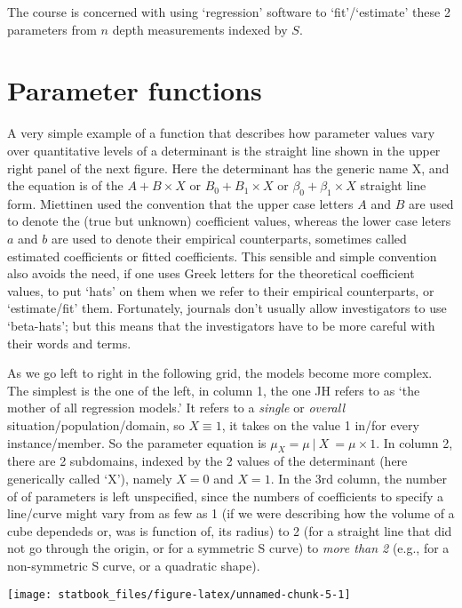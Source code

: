 \documentclass[]{book}
\begin{document}
The course is concerned with using `regression' software to `fit'/`estimate' these 2 parameters from \(n\) depth measurements indexed by \(S\).

\hypertarget{parameter-functions}{%
\section{Parameter functions}\label{parameter-functions}}

A very simple example of a function that describes how parameter values vary over quantitative levels of a determinant is the straight line shown in the upper right panel of the next figure. Here the determinant has the generic name X, and the equation is of the \(A + B \times X\) or \(B_0 + B_1 \times X\) or \(\beta_0 + \beta_1 \times X\) straight line form. Miettinen used the convention that the upper case letters \(A\) and \(B\) are used to denote the (true but unknown) coefficient values, whereas the lower case leters \(a\) and \(b\) are used to denote their empirical counterparts, sometimes called estimated coefficients or fitted coefficients. This sensible and simple convention also avoids the need, if one uses Greek letters for the theoretical coefficient values, to put `hats' on them when we refer to their empirical counterparts, or `estimate/fit' them. Fortunately, journals don't usually allow investigators to use `beta-hats'; but this means that the investigators have to be more careful with their words and terms.

As we go left to right in the following grid, the models become more complex. The simplest is the one of the left, in column 1, the one JH refers to as `the mother of all regression models.' It refers to a \emph{single} or \emph{overall} situation/population/domain, so \(X \equiv 1\), it takes on the value 1 in/for every instance/member. So the parameter equation is \(\mu_X = \mu \ | \ X \ = \mu \times 1.\) In column 2, there are 2 subdomains, indexed by the 2 values of the determinant (here generically called `X'), namely \(X = 0\) and \(X = 1\). In the 3rd column, the number of of parameters is left unspecified, since the numbers of coefficients to specify a line/curve might vary from as few as 1 (if we were describing how the volume of a cube dependeds or, was is function of, its radius) to 2 (for a straight line that did not go through the origin, or for a symmetric S curve) to \emph{more than 2} (e.g., for a non-symmetric S curve, or a quadratic shape).

\begin{center}\texttt{[image: statbook\_files/figure-latex/unnamed-chunk-5-1]} \end{center}
\end{document}
